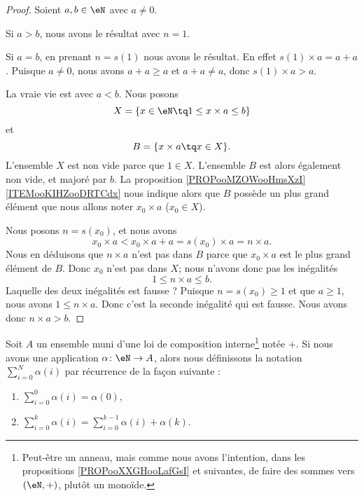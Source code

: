 \begin{proof}
    Soient \( a,b\in \eN\) avec \( a\neq 0\). 

    Si \( a>b\), nous avons le résultat avec \( n=1\).

    Si \( a=b\), en prenant \( n=s(1)\) nous avons le résultat. En effet \( s(1)\times a=a+a\). Puisque \( a\neq 0\), nous avons \( a+a\geq a\) et \( a+a\neq a\), donc \( s(1)\times a>a\).

    La vraie vie est avec \( a<b\). Nous posons
    \begin{equation}
        X=\{ x\in \eN\tq 1\leq x\times a\leq b \}
    \end{equation}
    et
    \begin{equation}
        B=\{ x\times a\tq x\in X \}.
    \end{equation}
    L'ensemble \( X\) est non vide parce que \( 1\in X\). L'ensemble \( B\) est alors également non vide, et majoré par \( b\). La proposition \ref{PROPooMZOWooHmsXzI}\ref{ITEMooKIHZooDRTCdx} nous indique alors que \( B\) possède un plus grand élément que nous allons noter \( x_0\times a\) (\( x_0\in X\)).

    Nous posons \( n=s(x_0)\), et nous avons
    \begin{equation}
        x_0\times a< x_0\times a +a=s(x_0)\times a=n\times a.
    \end{equation}
    Nous en déduisons que \( n\times a\) n'est pas dans \( B\) parce que \( x_0\times a\) est le plus grand élément de \( B\). Donc \( x_0\) n'est pas dans \( X\); nous n'avons donc pas les inégalités
    \begin{equation}
        1\leq n\times a\leq b.
    \end{equation}
    Laquelle des deux inégalités est fausse ? Puisque \( n=s(x_0)\geq 1\) et que \( a\geq 1\), nous avons \( 1\leq n\times a\). Donc c'est la seconde inégalité qui est fausse. Nous avons donc \( n\times a>b\).
\end{proof}

\begin{definition}      \label{DEFooNEVNooJlmJOC}
    Soit \( A\) un ensemble muni d'une loi de composition interne\footnote{Peut-être un anneau, mais comme nous avons l'intention, dans les propositions \ref{PROPooXXGHooLafGsI} et suivantes, de faire des sommes vers \( (\eN,+)\), plutôt un monoïde.} notée \( +\). Si nous avons une application \( \alpha\colon \eN\to A\), alors nous définissons la notation \( \sum_{i=0}^N\alpha(i)\) par récurrence de la façon suivante :
    \begin{enumerate}
        \item
            \( \sum_{i=0}^0\alpha(i)=\alpha(0)\),
        \item
            \( \sum_{i=0}^{k}\alpha(i)=\sum_{i=0}^{k-1}\alpha(i)+\alpha(k)\).
    \end{enumerate}
\end{definition}


